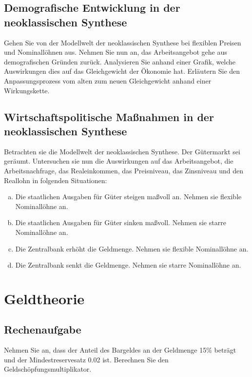 \documentclass{scrartcl}
\begin{document}
\subsection{Demografische Entwicklung in der neoklassischen Synthese}
Gehen Sie von der Modellwelt der neoklassischen Synthese bei flexiblen Preisen und Nominallöhnen aus. Nehmen Sie nun an, das Arbeitsangebot gehe aus demografischen Gründen zurück. Analysieren Sie anhand einer Grafik, welche Auswirkungen dies auf das Gleichgewicht der Ökonomie hat. Erläutern Sie den Anpassungsprozess vom alten zum neuen Gleichgewicht anhand einer Wirkungskette.

\subsection{Wirtschaftspolitische Maßnahmen in der neoklassischen Synthese}
Betrachten sie die Modellwelt der neoklassischen Synthese. Der Gütermarkt sei geräumt. Untersuchen sie nun die Auswirkungen auf das Arbeitsangebot, die Arbeitsnachfrage, das Realeinkommen, das Preisniveau, das Zinsniveau und den Reallohn in folgenden Situationen:
\begin{enumerate}[(a)]
	\item Die staatlichen Ausgaben für Güter steigen maßvoll an. Nehmen sie flexible Nominallöhne an.
	\item Die staatlichen Ausgaben für Güter sinken maßvoll. Nehmen sie starre Nominallöhne an.
	\item Die Zentralbank erhöht die Geldmenge. Nehmen sie flexible Nominallöhne an.
	\item Die Zentralbank senkt die Geldmenge. Nehmen sie starre Nominallöhne an.
\end{enumerate}




\newpage
\section{Geldtheorie}
\subsection{Rechenaufgabe}
Nehmen Sie an, dass der Anteil des Bargeldes an der Geldmenge 15\% beträgt und der
Mindestreservesatz 0.02 ist. Berechnen Sie den Geldschöpfungsmultiplikator. %
\end{document}
